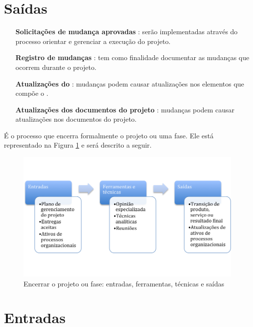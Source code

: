 \section{Saídas}

\begin{itemize}
	
	
	\item[\textbf{Solicitações de mudança aprovadas}] : serão implementadas através do processo orientar e gerenciar a execução do projeto.
	
	\item[\textbf{Registro de mudanças}] : tem como finalidade documentar as mudanças que ocorrem durante o projeto.
	
	\item[\textbf{Atualizações do \planproj}] :	mudanças podem causar atualizações nos elementos que compõe o \planproj.
	
	\item[\textbf{Atualizações dos documentos do projeto}] : mudanças podem causar atualizações nos documentos do projeto.
	
\end{itemize}




É o processo que encerra formalmente o projeto ou uma fase. Ele está representado na Figura \ref{fig:encerrar:etfs} e será descrito a seguir.

\begin{figure}[!h]
	\centering
	\includegraphics[scale=0.75]{Figuras/encerrar_efts.png}
	\caption{Encerrar o projeto ou fase: entradas, ferramentas, técnicas e saídas}
	\label{fig:encerrar:etfs}
\end{figure}

\section{Entradas}

